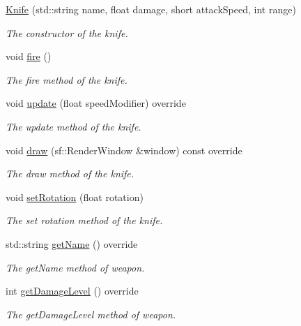 \begin{DoxyCompactItemize}
\item 
\hyperlink{class_knife_a4556bddf2c8705c79f192157ad98e42b}{Knife} (std\+::string name, float damage, short attack\+Speed, int range)
\begin{DoxyCompactList}\small\item\em The constructor of the knife. \end{DoxyCompactList}\item 
void \hyperlink{class_knife_af90e68f00a874b1bc75a1bc91b8c84d8}{fire} ()
\begin{DoxyCompactList}\small\item\em The fire method of the knife. \end{DoxyCompactList}\item 
void \hyperlink{class_knife_ac861c5829858e00f82cbfdddb4a7d0b4}{update} (float speed\+Modifier) override
\begin{DoxyCompactList}\small\item\em The update method of the knife. \end{DoxyCompactList}\item 
void \hyperlink{class_knife_a747c0cc2dcc81df06f63cc4259ed3556}{draw} (sf\+::\+Render\+Window \&window) const override
\begin{DoxyCompactList}\small\item\em The draw method of the knife. \end{DoxyCompactList}\item 
void \hyperlink{class_knife_a3a6345197e3a146c311e28145a257665}{set\+Rotation} (float rotation)
\begin{DoxyCompactList}\small\item\em The set rotation method of the knife. \end{DoxyCompactList}\item 
std\+::string \hyperlink{class_knife_a45e5c10b9b6aa04b0ef71fbbf25269d4}{get\+Name} () override
\begin{DoxyCompactList}\small\item\em The get\+Name method of weapon. \end{DoxyCompactList}\item 
int \hyperlink{class_knife_a9a3afd5408784399fc9cc7afc33eb3cd}{get\+Damage\+Level} () override
\begin{DoxyCompactList}\small\item\em The get\+Damage\+Level method of weapon. \end{DoxyCompactList}\item 

\end{DoxyCompactItemize}
